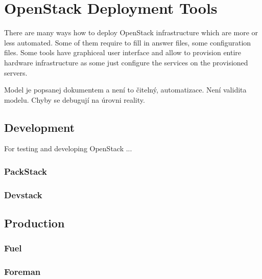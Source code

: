 
\section{OpenStack Deployment Tools}

There are many ways how to deploy OpenStack infrastructure which are more or less automated. Some of them require to fill in answer files, some configuration files. Some tools have graphiceal user interface and allow to provision entire hardware infrastructure as some just configure the services on the provisioned servers.

Model je popsanej dokumentem a není to čitelný, automatizace. Není validita modelu. Chyby se debugují na úrovni reality.

\subsection{Development}

For testing and developing OpenStack ...

\subsubsection{PackStack}

\subsubsection{Devstack}

\subsection{Production}

\subsubsection{Fuel}

\subsubsection{Foreman}
